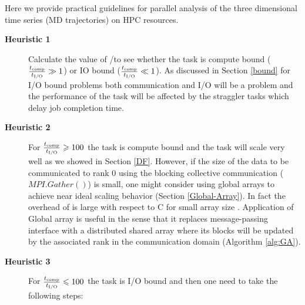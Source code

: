 \label{guideline}
Here we provide practical guidelines for parallel analysis of the three dimensional time series (MD trajectories) on HPC resources.

\begin{description}
  \item[\textbf{Heuristic 1}] Calculate the value of \tcomp/\tIO to see whether the task is compute bound ($\frac{{t}_{\text{comp}}}{{t}_{\text{I/O}}} \gg 1$) or IO bound ($\frac{{t}_{\text{comp}}}{{t}_{\text{I/O}}} \ll 1$). As discussed in Section \ref{bound} for I/O bound problems both communication and I/O will be a problem and the performance of the task will be affected by the straggler tasks which delay job completion time.  
  
  \item[\textbf{Heuristic 2}] For $\frac{{t}_{\text{comp}}}{{t}_{\text{I/O}}} \geqslant 100$ the task is compute bound and the task will scale very well as we showed in Section \ref{DF}. However, if the size of the data to be communicated to rank 0 using the blocking collective communication ($MPI.Gather()$) is small, one might consider using global arrays to achieve near ideal scaling behavior (Section \ref{Global-Array}). In fact the overhead of  is large with respect to C for small array size \cite{Dalcin:2011aa}. Application of Global array is useful in the sense that it replaces message-passing interface with a distributed shared array where its blocks will be updated by the associated rank in the communication domain (Algorithm \ref{alg:GA}). 
  \item[\textbf{Heuristic 3}] For $\frac{{t}_{\text{comp}}}{{t}_{\text{I/O}}} \leqslant 100$ the task is I/O bound and then one need to take the following steps:
   

\end{description}
